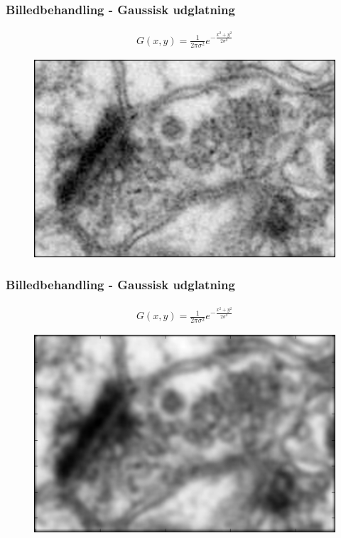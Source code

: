 \documentclass[12pt,t]{beamer}
\begin{document}
% 

\begin{frame}
\frametitle{Billedbehandling - Gaussisk udglatning}
\begin{align*}
	G(x,y) = \frac{1}{2\pi\sigma^2}e^{-\frac{x^2+y^2}{2\sigma^2}}
\end{align*}

\begin{figure}[H]
	\centering
	\includegraphics[scale=0.5]{img/orig/celle1gauss.png}
\end{figure}
\end{frame}

\begin{frame}
\frametitle{Billedbehandling - Gaussisk udglatning}
\begin{align*}
	G(x,y) = \frac{1}{2\pi\sigma^2}e^{-\frac{x^2+y^2}{2\sigma^2}}\label{ali:premethod_gaussG}
\end{align*}

\begin{figure}[H]
	\centering
	\includegraphics[scale=0.5]{../files/premethod/img/gausscell.png}
\end{figure}
\end{frame}
\end{document}
